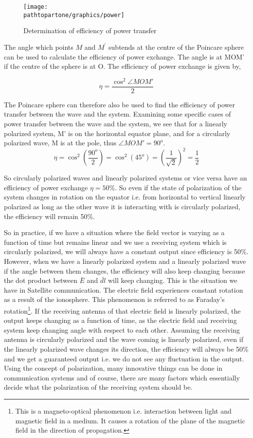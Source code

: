 \begin{figure}
\centering
\texttt{[image: \\pathtopartone/graphics/power]}
\caption{Determination of efficiency of power transfer}
\label{fig:power}
\end{figure}

The angle which points $M$ and $M^'$ subtends at the centre of the Poincare sphere can be used to calculate the efficiency of power exchange.
The angle is at MOM' if the centre of the sphere is at O. The efficiency of power exchange is given by,

\[\eta = {\frac{ \cos^2 \angle  MOM' }{2}}  \]

The Poincare sphere can therefore also be used to find the efficiency of power transfer between the wave and the system. Examining some specific cases of power transfer between the wave and the system, we see that for a linearly polarized system, M' is on the horizontal equator plane, and for a circularly polarized wave, M is at the pole, thus $\angle MOM' = 90^o$.
\[ \eta= \cos ^2(\frac{90^o}{2}) =\cos ^2(45^o) =(\frac{1}{\sqrt{2}})^2  = \frac{1}{2}\]

So circularly polarized waves and linearly polarized systems or vice versa have an efficiency of power exchange $ \eta=  50\% $. So even if the state of polarization of the system changes in rotation on the equator i.e. from horizontal to vertical linearly polarized as long as the other wave it is interacting with is circularly polarized, the efficiency will remain 50\%.

So in practice, if we have a situation where the field vector is varying as a function of time but remains linear and we use a receiving system which is circularly polarized, we will always have a constant output since efficiency is 50\%. However, when we have a linearly polarized system and a linearly polarized wave if the angle between them changes, the efficiency will also keep changing because the dot product between $ \bar {E} $ and $ \bar{dl} $ will keep changing. This is the situation we have in Satellite communication. The electric field experiences constant rotation as a result of the ionosphere. This phenomenon is referred to as Faraday's rotation\footnote{This is a magneto-optical phenomenon i.e. interaction between light and magnetic field in a medium. It causes a rotation of the plane of the magnetic field in the direction of propagation.}. If the receiving antenna of that electric field is linearly polarized, the output keeps changing as a function of time, as the electric field and receiving system keep changing angle with respect to each other. Assuming the receiving antenna is circularly polarized and the wave coming is linearly polarized, even if the linearly polarized wave changes its direction, the efficiency will always be 50\% and we get a guaranteed output i.e. we do not see any fluctuation in the output. Using the concept of polarization, many innovative things can be done in communication systems and of course, there are many factors which essentially decide what the polarization of the receiving system should be.

